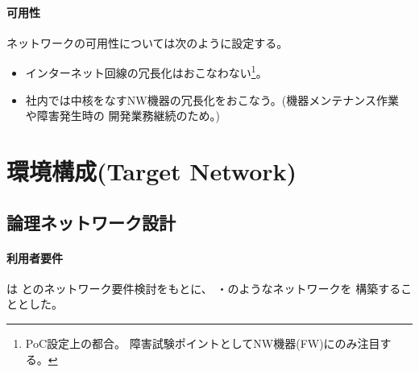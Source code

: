     \paragraph{可用性}

ネットワークの可用性については次のように設定する。
\begin{itemize}
 \item インターネット回線の冗長化はおこなわない\footnote{PoC設定上の都合。
       障害試験ポイントとしてNW機器(FW)にのみ注目する。}。
 \item 社内では中核をなすNW機器の冗長化をおこなう。(機器メンテナンス作業
       や障害発生時の \tj 開発業務継続のため。)
\end{itemize}

 \section{環境構成(Target Network)}


  \subsection{論理ネットワーク設計}
  \label{sec:logical-nw-design}

  \paragraph{利用者要件}
\tj は \yo とのネットワーク要件検討をもとに、
・のようなネットワークを
構築することとした。

